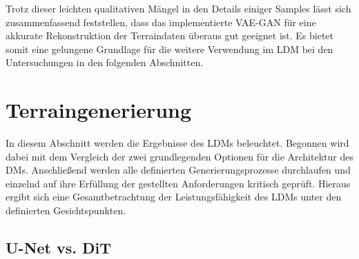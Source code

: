 Trotz dieser leichten qualitativen Mängel in den Details einiger Samples lässt sich zusammenfassend feststellen, dass das implementierte VAE-GAN für eine akkurate Rekonstruktion der Terraindaten überaus gut geeignet ist. Es bietet somit eine gelungene Grundlage für die weitere Verwendung im \ac{LDM} bei den Untersuchungen in den folgenden Abschnitten.

\section {Terraingenerierung}

In diesem Abschnitt werden die Ergebnisse des LDMs beleuchtet. Begonnen wird dabei mit dem Vergleich der zwei grundlegenden Optionen für die Architektur des \ac{DM}s. Anschließend werden alle definierten Generierungsprozesse durchlaufen und einzelnd auf ihre Erfüllung der gestellten Anforderungen kritisch geprüft. Hieraus ergibt sich eine Gesamtbetrachtung der Leistungsfähigkeit des \ac{LDM}s unter den definierten Gesichtspunkten. 

\subsection {U-Net vs. DiT}

